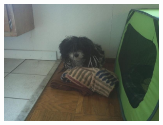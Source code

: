 \documentclass[aspectratio=1610,pdftex,dvipsnames,compress,xcolor={dvipsnames}]{beamer}
\newcommand{\acs}{\acrshort} %
\begin{document}
\begin{frame}[plain]{}
    \begin{figure}
        \centering
        \includegraphics[width=0.75\textwidth]{final.jpg}
    \end{figure}
\end{frame}


%
%
%



%    
%    
\end{document}
